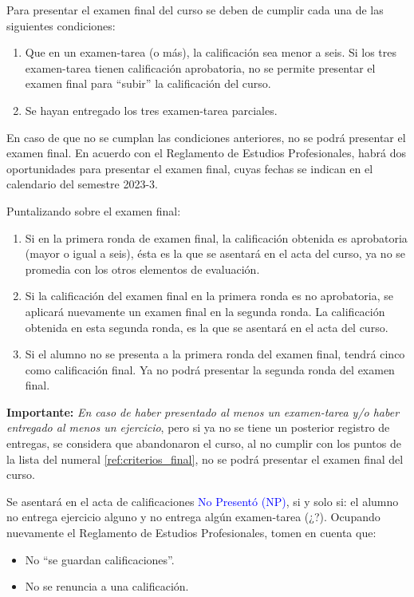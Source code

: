 Para presentar el examen final del curso se deben de cumplir cada una de las siguientes condiciones:
\begin{enumerate}\label{ref:criterios_final}
\item Que en un examen-tarea (o más), la calificación sea menor a seis. Si los tres examen-tarea tienen calificación aprobatoria, no se permite presentar el examen final para \enquote{subir} la calificación del curso.
\item Se hayan entregado los tres examen-tarea parciales.
\end{enumerate}
En caso de que no se cumplan las condiciones anteriores, no se podrá presentar el examen final. En acuerdo con el Reglamento de Estudios Profesionales, habrá dos oportunidades para presentar el examen final, cuyas fechas se indican en el calendario del semestre 2023-3.
\par
Puntalizando sobre el examen final:
\begin{enumerate}[label=\roman*)]
\item Si en la primera ronda de examen final, la calificación obtenida es aprobatoria (mayor o igual a seis), ésta es la que se asentará en el acta del curso, ya no se promedia con los otros elementos de evaluación.
\item Si la calificación del examen final en la primera ronda es no aprobatoria, se aplicará nuevamente un examen final en la segunda ronda. La calificación obtenida en esta segunda ronda, es la que se asentará en el acta del curso.
\item Si el alumno no se presenta a la primera ronda del examen final, tendrá cinco como calificación final. Ya no podrá presentar la segunda ronda del examen final.
\end{enumerate}
\par
\textbf{Importante: } \emph{En caso de haber presentado al menos un examen-tarea y/o haber entregado al menos un ejercicio}, pero si ya no se tiene un posterior registro de entregas, se considera que abandonaron el curso, al no cumplir con los puntos de la lista del numeral \ref{ref:criterios_final}, no se podrá presentar el examen final del curso.
\par
Se asentará en el acta de calificaciones \textcolor{blue}{No Presentó (NP)}, si y solo si: el alumno no entrega ejercicio alguno y no entrega algún examen-tarea (¿?). Ocupando nuevamente el Reglamento de Estudios Profesionales, tomen en cuenta que:
\begin{itemize}
\setlength\itemsep{1pt}
\item No \enquote{se guardan calificaciones}.
\item No se renuncia a una calificación.
\end{itemize}

